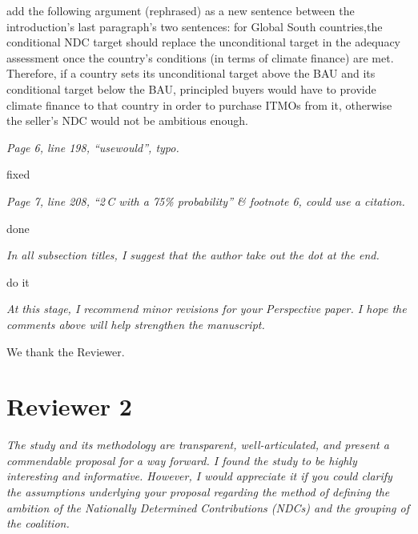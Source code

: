\documentclass[11pt]{article}
\newenvironment{italic}{\itshape}{\par}
\begin{document}
add the following argument (rephrased) as a new sentence between the introduction's last paragraph's two sentences:
for Global South countries,the conditional NDC target should replace the unconditional target in the adequacy assessment once the country’s conditions (in terms of climate finance) are met. Therefore, if a country sets its unconditional target above the BAU and its conditional target below the BAU, principled buyers would have to provide climate finance to that country in order to purchase ITMOs from it, otherwise the seller’s NDC would not be ambitious enough.


\begin{italic}
Page 6, line 198, ``usewould'', typo.
\end{italic}


fixed



\begin{italic}
Page 7, line 208, ``2\,\textdegree C with a 75\% probability'' \& footnote 6, could use a citation.
\end{italic}


done



\begin{italic}
In all subsection titles, I suggest that the author take out the dot at the end.
\end{italic}

do it




\begin{italic}
At this stage, I recommend minor revisions for your Perspective paper. I hope the comments above will help strengthen the manuscript.
\end{italic}



We thank the Reviewer.



\section*{Reviewer 2}

\begin{italic}
The study and its methodology are transparent, well-articulated, and present a commendable proposal for a way forward. I found the study to be highly interesting and informative. However, I would appreciate it if you could clarify the assumptions underlying your proposal regarding the method of defining the ambition of the Nationally Determined Contributions (NDCs) and the grouping of the coalition.
\end{italic}
\end{document}
